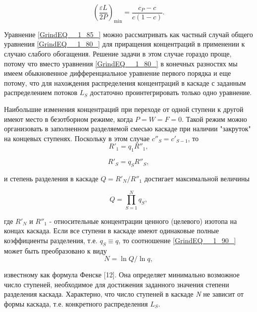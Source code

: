 \begin{equation} \label{GrindEQ__1_87_} 
\left(\frac{\varepsilon L}{2P} \right)_{\min } =\frac{c_{P} -c}{c(1-c)} .                                   
\end{equation} 

Уравнение \ref{GrindEQ__1_85_} можно рассматривать как частный случай общего уравнения \ref{GrindEQ__1_80_} для приращения концентраций в применении к случаю слабого обогащения. Решение задачи в этом случае гораздо проще, потому что вместо уравнения \ref{GrindEQ__1_80_} в конечных разностях мы имеем обыкновенное дифференциальное уравнение первого порядка и еще потому, что для нахождения распределения концентраций в каскаде с заданным распределением потоков $L_{S} $ достаточно проинтегрировать только одно уравнение.

Наибольшие изменения концентраций при переходе от одной ступени к другой имеют место в безотборном режиме, когда $P=W=F=0$. Такой режим можно организовать в заполненном разделяемой смесью каскаде при наличии "закруток" на концевых ступенях. Поскольку в этом случае $c''_{S} =c'_{S-1} $, то
\begin{equation} \label{GrindEQ__1_88_} 
R'_{1} =q_{1} R''_{1} ,    
\end{equation}

\begin{equation} \label{GrindEQ__1_89_} 
R'_{S} =q_{S} R''_{S} ,    
\end{equation} 

и степень разделения в каскаде $Q=R'_{N}/R''_{1}$ достигает максимальной величины

\begin{equation} \label{GrindEQ__1_90_} 
Q=\prod _{S=1}^{N}q_{S},                      
\end{equation} 

где $R'_{N} $ и $R''_{{1}} $ - относительные концентрации ценного (целевого) изотопа на концах каскада. Если все ступени в каскаде имеют одинаковые полные коэффициенты разделения, т.е. $q_{S} \equiv q$, то соотношение \ref{GrindEQ__1_90_} может быть преобразовано к виду
\begin{equation} \label{GrindEQ__1_91_} 
N=\ln Q/\ln q,     
\end{equation} 

известному как формула Фенске [12]. Она определяет минимально возможное число ступеней, необходимое для достижения заданного значения степени разделения каскада. Характерно, что число ступеней в каскаде \textit{N} не зависит от формы каскада, т.е. конкретного распределения $L_{S} $.

